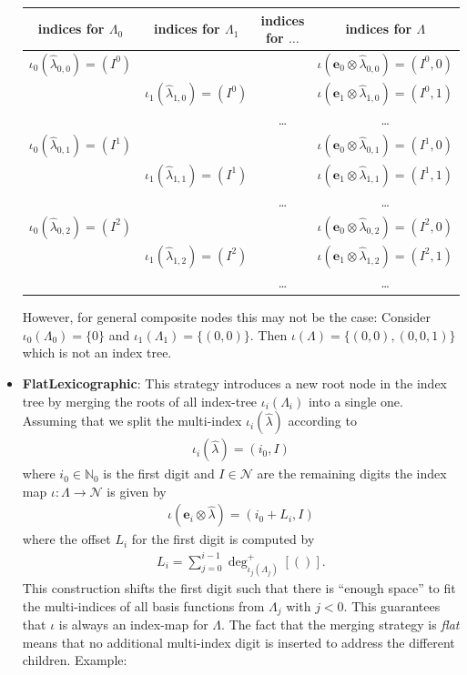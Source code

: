 \documentclass[a4paper,10pt,headings=normal,bibliography=totoc]{scrartcl}
\begin{document}
\begin{itemize}
    \begin{tabular}{c|c|c|c}
      indices for $\Lambda_0$ &
      indices for $\Lambda_1$ &
      indices for $\dots$ &
      indices for $\Lambda$ \\
      \hline
      $\iota_0(\hat{\lambda}_{0,0}) = (I^0)$ & & &
        $\iota(\mathbf{e}_0 \otimes \hat{\lambda}_{0,0}) = (I^0,0)$ \\
      & $\iota_1(\hat{\lambda}_{1,0}) = (I^0)$ & &
        $\iota(\mathbf{e}_1 \otimes \hat{\lambda}_{1,0}) = (I^0,1)$ \\
      & & \dots &
        \dots \\
      $\iota_0(\hat{\lambda}_{0,1}) = (I^1)$ & & &
        $\iota(\mathbf{e}_0 \otimes \hat{\lambda}_{0,1}) = (I^1,0)$ \\
      & $\iota_1(\hat{\lambda}_{1,1}) = (I^1)$ & &
        $\iota(\mathbf{e}_1 \otimes \hat{\lambda}_{1,1}) = (I^1,1)$ \\
      & & \dots &
        \dots \\
      $\iota_0(\hat{\lambda}_{0,2}) = (I^2)$ & & &
        $\iota(\mathbf{e}_0 \otimes \hat{\lambda}_{0,2}) = (I^2,0)$ \\
      & $\iota_1(\hat{\lambda}_{1,2}) = (I^2)$ & &
        $\iota(\mathbf{e}_1 \otimes \hat{\lambda}_{1,2}) = (I^2,1)$ \\
      & & \dots &
        \dots \\
    \end{tabular}

    However, for general composite nodes this may not be the case:
    Consider $\iota_0(\Lambda_0) = \{0\}$ and $\iota_1(\Lambda_1) = \{(0,0)\}$.
    Then $\iota(\Lambda) = \{(0,0), (0,0,1)\}$ which is not an index tree.

  \item \textbf{FlatLexicographic}: This strategy introduces
    a new root node in the index tree by merging the roots of all
    index-tree $\iota_i(\Lambda_i)$ into a single one.
    Assuming that we split the multi-index
    $\iota_i(\hat{\lambda})$ according to
    \begin{align}\label{eq:multiindex-split}
      \iota_i(\hat{\lambda}) = (i_0,I)
    \end{align} 
    where $i_0 \in \mathbb{N}_0$ is the first digit and
    $I \in \mathcal{N}$ are the remaining digits
    the index map $\iota:\Lambda \to \mathcal{N}$ is given by
    \begin{align*}
      \iota(\mathbf{e}_i \otimes\hat{\lambda}) = (i_0 + L_i, I)
    \end{align*}
    where the offset $L_i$ for the first digit is computed by
    \begin{align*}
      L_i = \sum_{j=0}^{i-1} \operatorname{deg}_{\iota_j(\Lambda_j)}^+[()].
    \end{align*}
    This construction shifts the first digit such that there is ``enough space''
    to fit the multi-indices of all basis functions from $\Lambda_j$ with $j<0$.
    This guarantees that $\iota$ is always an index-map for $\Lambda$.
    The fact that the merging strategy is \emph{flat} means that no
    additional multi-index digit is inserted to address the different children.
    Example:


\end{itemize}
\end{document}
